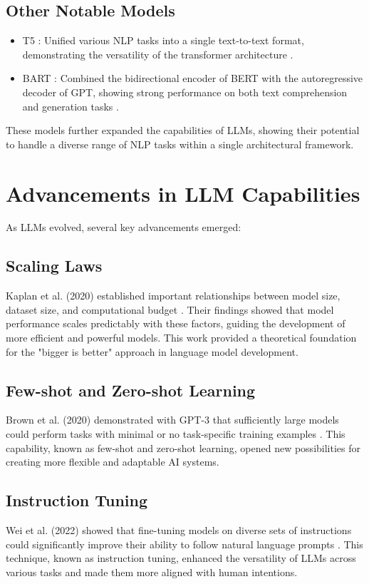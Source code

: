 \documentclass[logo,msc]{infthesis}           %
\begin{document}
\subsection*{Other Notable Models}
\begin{itemize}

    \item T5 : Unified various NLP tasks into a single text-to-text format, demonstrating the versatility of the transformer architecture \cite{raffel2020exploring}.
    \item BART : Combined the bidirectional encoder of BERT with the autoregressive decoder of GPT, showing strong performance on both text comprehension and generation tasks \cite{lewis2019bart}.
\end{itemize}
These models further expanded the capabilities of LLMs, showing their potential to handle a diverse range of NLP tasks within a single architectural framework.

\section{Advancements in LLM Capabilities}
As LLMs evolved, several key advancements emerged:
\subsection*{Scaling Laws}
Kaplan et al. (2020) established important relationships between model size, dataset size, and computational budget \cite{kaplan2020scaling}. Their findings showed that model performance scales predictably with these factors, guiding the development of more efficient and powerful models. This work provided a theoretical foundation for the "bigger is better" approach in language model development.
\subsection*{Few-shot and Zero-shot Learning}
Brown et al. (2020) demonstrated with GPT-3 that sufficiently large models could perform tasks with minimal or no task-specific training examples \cite{brown2020language}. This capability, known as few-shot and zero-shot learning, opened new possibilities for creating more flexible and adaptable AI systems.
\subsection*{Instruction Tuning}
Wei et al. (2022) showed that fine-tuning models on diverse sets of instructions could significantly improve their ability to follow natural language prompts \cite{wei2022finetunedlanguagemodelszeroshot}. This technique, known as instruction tuning, enhanced the versatility of LLMs across various tasks and made them more aligned with human intentions.
\end{document}
